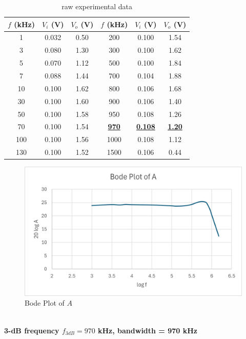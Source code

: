 \documentclass{article}
\begin{document}
\begin{CJK*}{UTF8}{bkai}
\begin{minipage}{0.5\textwidth}
\begin{table}[H]
\begin{tabular}{|c|c|c||c|c|c|}
    \hline
    $f$ (\unit{\kilo\hertz}) &  $V_i$ (V)& $V_o$ (V) & $f$ (\unit{\kilo\hertz}) &  $V_i$ (V)& $V_o$ (V)\\
    \hline\hline
    1	    & 0.032 & 0.50 & 200    & 0.100 & 1.54   \\
    3       & 0.080 & 1.30 & 300    & 0.100 & 1.62   \\
    5	    & 0.070 & 1.12 & 500    & 0.100 & 1.84   \\
    7	    & 0.088 & 1.44 & 700    & 0.104 & 1.88   \\
    10	    & 0.100 & 1.62 & 800    & 0.106 & 1.68   \\
    30	    & 0.100 & 1.60 & 900    & 0.106 & 1.40   \\
    50	    & 0.100 & 1.58 & 950    & 0.108 & 1.26   \\
    70  	& 0.100 & 1.54 & \underline{\textbf{970}}  & \underline{\textbf{0.108}} & \underline{\textbf{1.20}}   \\
    100     & 0.100 & 1.56 & 1000   & 0.108 & 1.12   \\
    130     & 0.100 & 1.52 & 1500   & 0.106 & 0.44   \\
\hline
\end{tabular}
\caption{raw experimental data}
\end{table}
\end{minipage}\hspace{20mm}
\begin{minipage}{0.5\textwidth}
    \begin{figure}[H]    
        \includegraphics[scale=0.60]{bodeplotA.png}
        \caption{Bode Plot of $A$}
    \end{figure}
\end{minipage}
\vspace{3mm}\\
\textbf{3-dB frequency $f_{3dB} = 970$ \unit{\kilo\hertz}, bandwidth = 970 \unit{\kilo\hertz}}\\


\end{CJK*}
\end{document}
